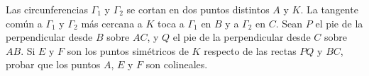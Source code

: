 Las circunferencias $\Gamma_1$ y $\Gamma_2$ se cortan en dos puntos distintos $A$ y $K$. La tangente común a $\Gamma_1$ y $\Gamma_2$ más cercana a $K$ toca a $\Gamma_1$ en $B$ y a $\Gamma_2$ en $C$. Sean $P$ el pie de la perpendicular desde $B$ sobre $AC$, y $Q$ el pie de la perpendicular desde $C$ sobre $AB$. Si $E$ y $F$ son los puntos simétricos de $K$ respecto de las rectas $PQ$ y $BC$, probar que los puntos $A$, $E$ y $F$ son colineales.
